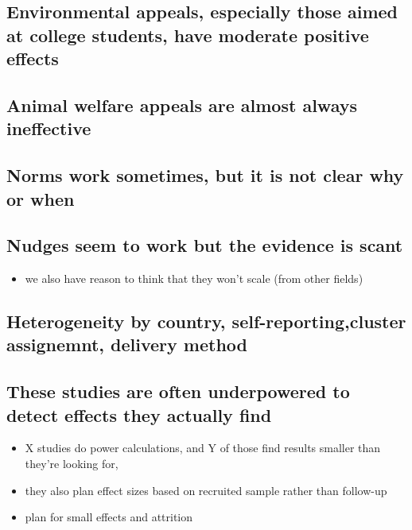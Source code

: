 \documentclass[sn-nature,pdflatex]{sn-jnl}
\providecommand{\tightlist}{%
  \setlength{\itemsep}{0pt}\setlength{\parskip}{0pt}}
\begin{document}
\subsection{Environmental appeals, especially those aimed at college
students, have moderate positive
effects}\label{environmental-appeals-especially-those-aimed-at-college-students-have-moderate-positive-effects}

\subsection{Animal welfare appeals are almost always
ineffective}\label{animal-welfare-appeals-are-almost-always-ineffective}

\subsection{Norms work sometimes, but it is not clear why or
when}\label{norms-work-sometimes-but-it-is-not-clear-why-or-when}

\subsection{Nudges seem to work but the evidence is
scant}\label{nudges-seem-to-work-but-the-evidence-is-scant}

\begin{itemize}
\tightlist
\item
  we also have reason to think that they won't scale (from other fields)
\end{itemize}

\subsection{Heterogeneity by country, self-reporting,cluster assignemnt,
delivery
method}\label{heterogeneity-by-country-self-reportingcluster-assignemnt-delivery-method}

\subsection{These studies are often underpowered to detect effects they
actually
find}\label{these-studies-are-often-underpowered-to-detect-effects-they-actually-find}

\begin{itemize}
\tightlist
\item
  X studies do power calculations, and Y of those find results smaller
  than they're looking for,
\item
  they also plan effect sizes based on recruited sample rather than
  follow-up
\item
  plan for small effects and attrition
\end{itemize}
\end{document}
